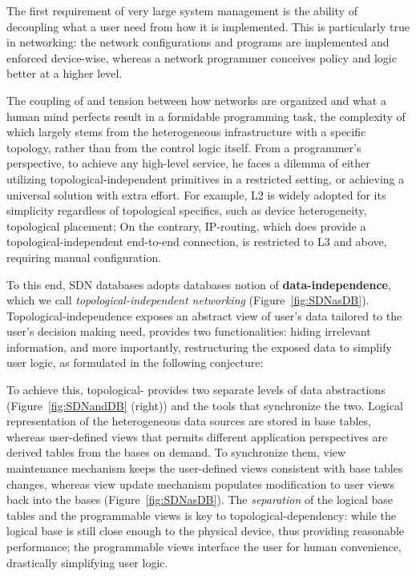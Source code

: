 
The first requirement of very large system management is the ability
of decoupling what a user need from how it is implemented. This is
particularly true in networking: the network configurations and
programs are implemented and enforced device-wise, whereas a network
programmer conceives policy and logic better at a higher level.

The coupling of and tension between how networks are organized and
what a human mind perfects result in a formidable programming task,
the complexity of which largely stems from the heterogeneous
infrastructure with a specific topology, rather than from the control
logic itself. From a programmer's perspective, to achieve any
high-level service, he faces a dilemma of either utilizing
topological-independent primitives in a restricted setting, or
achieving a universal solution with extra effort. For example, L2 is
widely adopted for its simplicity regardless of topological specifics,
such as device heterogeneity, topological placement; On the contrary,
IP-routing, which does provide a topological-independent end-to-end
connection, is restricted to L3 and above, requiring manual
configuration.

To this end, SDN databases adopts databases notion of
\textbf{data-independence}, which we call
\emph{topological-independent networking}
(Figure~\ref{fig:SDNasDB}). Topological\hyp{}independence exposes an
abstract view of user's data tailored to the user's decision making
need, provides two functionalities: hiding irrelevant information, and
more importantly, restructuring the exposed data to simplify user
logic, as formulated in the following conjecture:


To achieve this, topological\hyp{} provides two separate levels of
data abstractions (Figure~\ref{fig:SDNandDB} (right)) and the tools
that synchronize the two. Logical representation of the heterogeneous
data sources are stored in base tables, whereas user\hyp{}defined
views that permits different application perspectives are derived
tables from the bases on demand.  To synchronize them, view
maintenance mechanism keeps the user\hyp{}defined views consistent
with base tables changes, whereas view update mechanism populates
modification to user views back into the bases
(Figure~\ref{fig:SDNasDB}).  The \textit{separation} of the logical
base tables and the programmable views is key to
topological\hyp{}dependency: while the logical base is still close
enough to the physical device, thus providing reasonable performance;
the programmable views interface the user for human convenience,
drastically simplifying user logic.

